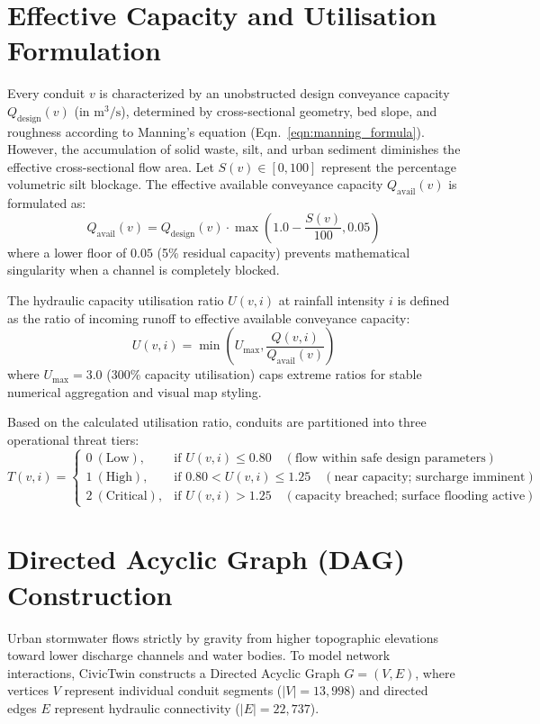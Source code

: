\section{Effective Capacity and Utilisation Formulation}
Every conduit $v$ is characterized by an unobstructed design conveyance capacity $Q_{\text{design}}(v)$ (in $\text{m}^3/\text{s}$), determined by cross-sectional geometry, bed slope, and roughness according to Manning's equation (Eqn.~\ref{eqn:manning_formula}). However, the accumulation of solid waste, silt, and urban sediment diminishes the effective cross-sectional flow area. Let $S(v) \in [0, 100]$ represent the percentage volumetric silt blockage. The effective available conveyance capacity $Q_{\text{avail}}(v)$ is formulated as:
\begin{equation}
Q_{\text{avail}}(v) = Q_{\text{design}}(v) \cdot \max\left(1.0 - \frac{S(v)}{100}, 0.05\right)
\label{eqn:avail_capacity}
\end{equation}
where a lower floor of $0.05$ (5\% residual capacity) prevents mathematical singularity when a channel is completely blocked.

The hydraulic capacity utilisation ratio $U(v, i)$ at rainfall intensity $i$ is defined as the ratio of incoming runoff to effective available conveyance capacity:
\begin{equation}
U(v, i) = \min\left(U_{\max}, \frac{Q(v, i)}{Q_{\text{avail}}(v)}\right)
\label{eqn:utilisation_def}
\end{equation}
where $U_{\max} = 3.0$ (300\% capacity utilisation) caps extreme ratios for stable numerical aggregation and visual map styling. 

Based on the calculated utilisation ratio, conduits are partitioned into three operational threat tiers:
\begin{equation}
T(v, i) = \begin{cases}
0~(\text{Low}), & \text{if } U(v, i) \le 0.80 \quad (\text{flow within safe design parameters}) \\
1~(\text{High}), & \text{if } 0.80 < U(v, i) \le 1.25 \quad (\text{near capacity; surcharge imminent}) \\
2~(\text{Critical}), & \text{if } U(v, i) > 1.25 \quad (\text{capacity breached; surface flooding active})
\end{cases}
\label{eqn:threat_tier}
\end{equation}

\section{Directed Acyclic Graph (DAG) Construction}
Urban stormwater flows strictly by gravity from higher topographic elevations toward lower discharge channels and water bodies. To model network interactions, CivicTwin constructs a Directed Acyclic Graph $G = (V, E)$, where vertices $V$ represent individual conduit segments ($|V| = 13{,}998$) and directed edges $E$ represent hydraulic connectivity ($|E| = 22{,}737$).

